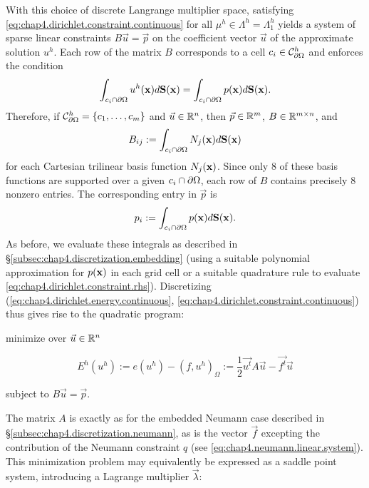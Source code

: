 With this choice of discrete Langrange multiplier space, satisfying \eqref{eq:chap4.dirichlet.constraint.continuous} for all $\mu^h \in \Lambda^h = \Lambda^h_1$ yields a system of sparse linear constraints $B \vec{u} = \vec{p}$ on the coefficient vector $\vec{u}$ of the approximate solution $u^h$. Each row of the matrix $B$ corresponds to a cell $c_i \in \mathcal{C}^{h}_{\partial\Omega}$ and enforces the condition
\begin{equation} \label{eq:chap4.dirichlet.constraint.discrete}
\int_{c_i \cap \partial\Omega} u^h(\mathbf{x}) d\mathbf{S}(\mathbf{x}) = \int_{c_i \cap \partial\Omega} p(\mathbf{x}) d\mathbf{S}(\mathbf{x}).
\end{equation}
Therefore, if $\mathcal{C}^h_{\partial\Omega} = \left\lbrace  c_1, \dotsc, c_m  \right\rbrace$ and $\vec{u} \in \mathbb{R}^n$, then $\vec{p} \in \mathbb{R}^m$, $B \in \mathbb{R}^{m \times n}$, and
\begin{equation} \label{eq:chap4.dirichlet.constraint.matrix}
B_{ij} := \int_{c_i \cap \partial\Omega} N_j(\mathbf{x}) d\mathbf{S}(\mathbf{x})
\end{equation}
for each Cartesian trilinear basis function $N_j(\mathbf{x})$. Since only $8$ of these basis functions are supported over a given $c_i \cap \partial\Omega$, each row of $B$ contains precisely $8$ nonzero entries. The corresponding entry in $\vec{p}$ is
\begin{equation} \label{eq:chap4.dirichlet.constraint.rhs}
p_i := \int_{c_i \cap \partial\Omega} p(\mathbf{x}) d\mathbf{S}(\mathbf{x}).
\end{equation}
As before, we evaluate these integrals as described in \S\ref{subsec:chap4.discretization.embedding} (using a suitable polynomial approximation for $p(\mathbf{x})$ in each grid cell or a suitable quadrature rule to evaluate \eqref{eq:chap4.dirichlet.constraint.rhs}). Discretizing (\ref{eq:chap4.dirichlet.energy.continuous}, \ref{eq:chap4.dirichlet.constraint.continuous}) thus gives rise to the quadratic program:
\begin{center}
minimize over $\vec{u} \in \mathbb{R}^n$
\end{center}
\begin{equation} \label{eq:chap4.quadraticminimization.discrete}
E^h(u^h) := e(u^h) - (f, u^h)_{\Omega} := \frac{1}{2} \vec{u^t} A \vec{u} - \vec{f^t} \vec{u}
\end{equation}
\begin{center}
subject to $B \vec{u} = \vec{p}$.
\end{center}
The matrix $A$ is exactly as for the embedded Neumann case described in \S\ref{subsec:chap4.discretization.neumann}, as is the vector $\vec{f}$ excepting the contribution of the Neumann constraint $q$ (see \eqref{eq:chap4.neumann.linear.system}). This minimization problem may equivalently be expressed as a saddle point system, introducing a Lagrange multiplier $\vec{\lambda}$:
